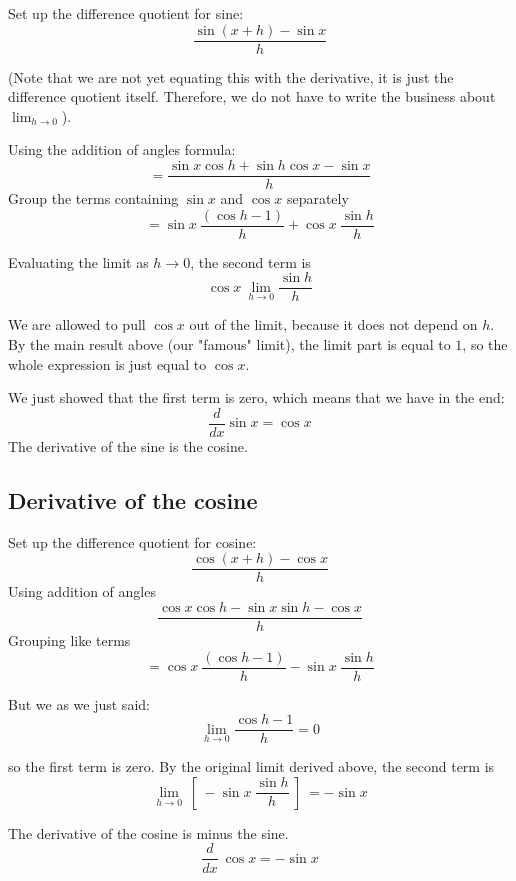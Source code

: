 \documentclass[11pt, oneside]{article}
\begin{document}
Set up the difference quotient for sine:
\[  \frac{\sin (x + h) - \sin x}{h} \]

(Note that we are not yet equating this with the derivative, it is just the difference quotient itself.  Therefore, we do not have to write the business about $\lim_{h \rightarrow 0}$).

Using the addition of angles formula:
\[ = \frac{\sin x \cos h + \sin h \cos x - \sin x}{h} \]
Group the terms containing $\sin x$ and $\cos x$ separately
\[ = \sin x \ \frac{(\cos h - 1)}{h} + \cos x \ \frac{\sin h}{h} \]

Evaluating the limit as $h \rightarrow 0$, the second term is
\[ \cos x \ \lim_{h \rightarrow 0} \frac{\sin h}{h} \]

We are allowed to pull $\cos x$ out of the limit, because it does not depend on $h$.  By the main result above (our "famous" limit), the limit part is equal to $1$, so the whole expression is just equal to $\cos x$.

We just showed that the first term is zero, which means that we have in the end:
\[ \frac{d}{dx} \sin x = \cos x \]
The derivative of the sine is the cosine.

\subsection*{Derivative of the cosine}

Set up the difference quotient for cosine:
\[  \frac{\cos (x + h) - \cos x}{h} \]
Using addition of angles
\[ \frac{\cos x \cos h - \sin x \sin h - \cos x}{h} \]
Grouping like terms
\[ = \cos x \ \frac{(\cos h - 1)}{h}  - \sin x \ \frac{\sin h}{h} \]

But we as we just said:
\[  \lim_{h \rightarrow 0} \frac{\cos h - 1}{h} = 0 \]

so the first term is zero.  By the original limit derived above, the second term is
\[ \lim_{h \rightarrow 0} \ [ \ - \sin x \ \frac{\sin h}{h} \ ] \ = - \sin x \]

The derivative of the cosine is minus the sine.
\[ \frac{d}{dx} \ \cos x = - \sin x \]
\end{document}

